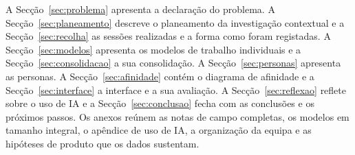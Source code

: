 A Secção~\ref{sec:problema} apresenta a declaração do problema. A Secção~\ref{sec:planeamento} descreve o planeamento da 
investigação contextual e a Secção~\ref{sec:recolha} as sessões realizadas e a forma como foram registadas. A Secção~\ref{sec:modelos} 
apresenta os modelos de trabalho individuais e a Secção~\ref{sec:consolidacao} a sua consolidação. A Secção~\ref{sec:personas} apresenta as 
personas. A Secção~\ref{sec:afinidade} contém o diagrama de afinidade e a Secção~\ref{sec:interface} a interface e a sua avaliação. 
A Secção~\ref{sec:reflexao} reflete sobre o uso de IA e a Secção~\ref{sec:conclusao} fecha com as conclusões e os próximos passos. 
Os anexos reúnem as notas de campo completas, os modelos em tamanho integral, o apêndice de uso de IA, a organização da equipa e as 
hipóteses de produto que os dados sustentam.
